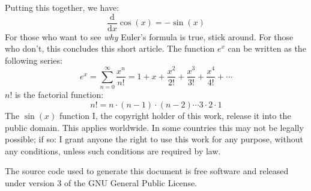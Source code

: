\documentclass{article}
\theoremstyle{normal}
\theoremstyle{plain}
\begin{document}
    Putting this together, we have:
    \begin{equation}
        \frac{\text{d}}{\text{d}x}\cos(x)=-\sin(x)
    \end{equation}
    For those who want to see \textit{why} Euler's formula is true, stick
    around. For those who don't, this concludes this short article.
    The function $e^{x}$ can be written as the following series:
    \begin{equation}
        e^{x}=\sum_{n=0}^{\infty}\frac{x^{n}}{n!}=1+x+\frac{x^{2}}{2!}
            +\frac{x^{3}}{3!}+\frac{x^{4}}{4!}+\cdots
    \end{equation}
    $n!$ is the factorial function:
    \begin{equation}
        n!=n\cdot(n-1)\cdot(n-2)\cdots{3}\cdot{2}\cdot{1}
    \end{equation}
    The $\sin(x)$ function
    \newpage
    I, the copyright holder of this work, release it into the public domain.
    This applies worldwide. In some countries this may not be legally possible;
    if so: I grant anyone the right to use this work for any purpose, without
    any conditions, unless such conditions are required by law.
    \par\hfill\par
    The source code used to generate this document is free software and released
    under version 3 of the GNU General Public License.
\end{document}
